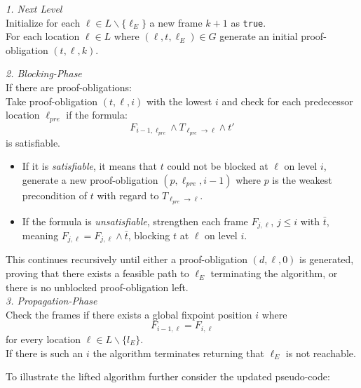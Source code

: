 \documentclass[11pt, a4paper, BCOR=10mm, ngerman]{scrbook}
\begin{document}
\textsl{1. Next Level} \\
Initialize for each $\ell \in L \backslash \{\ell_E\}$ a new frame $k + 1$ as \texttt{true}. \\
For each location $\ell \in L$ where $(\ell, t, \ell_E) \in G$ generate an initial proof-obligation $(t, \ell, k)$. \\

\pagebreak

\textsl{2. Blocking-Phase} \\
If there are proof-obligations: \\
Take proof-obligation $(t, \ell, i)$ with the lowest $i$ and check for each predecessor location $\ell_{pre}$ if the formula:
\begin{equation*}
F_{i - 1, \ell_{pre}} \land T_{\ell_{pre} \rightarrow \ell} \land t'
\end{equation*}
is satisfiable.
\begin{itemize}
\item If it is \textsl{satisfiable}, it means that $t$ could not be blocked at $\ell$ on level $i$, generate a new proof-obligation $(p, \ell_{pre}, i-1)$ where $p$ is the weakest precondition of $t$ with regard to $T_{\ell_{pre} \rightarrow \ell}$.
\item If the formula is \textsl{unsatisfiable}, strengthen each frame $F_{j, \ell}$, $j \leq i$ with $\bar t$, meaning $F_{j, \ell} = F_{j, \ell} \land \bar t$, blocking $t$ at $\ell$ on level $i$.
\end{itemize}

This continues recursively until either a proof-obligation $(d, \ell, 0)$ is generated, proving that there exists a feasible path to $\ell_E$ terminating the algorithm, or there is no unblocked proof-obligation left. \\

\textsl{3. Propagation-Phase} \\
Check the frames if there exists a global fixpoint position $i$ where
\begin{equation*}
F_{i-1, \ell} = F_{i, \ell}
\end{equation*}
for every location $\ell \in L \backslash \{l_E \}$. \\
If there is such an $i$ the algorithm terminates returning that $\ell_E$ is not reachable. \\

\pagebreak

To illustrate the lifted algorithm further consider the updated pseudo-code: \\ \\
\end{document}
